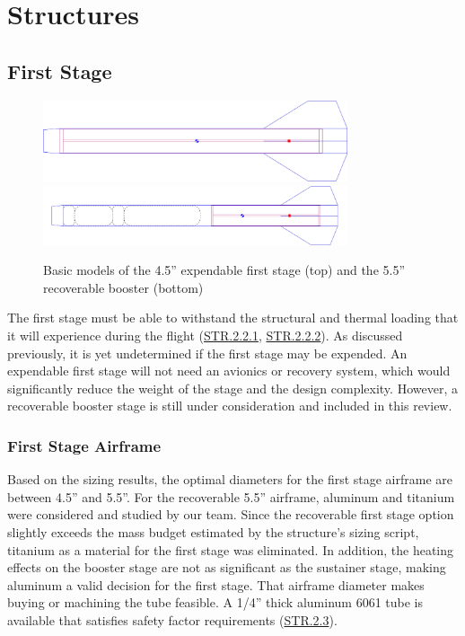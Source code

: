 \section{Structures} \label{section:structures}
\subsection{First Stage}

\begin{figure}
    \centering
    \includegraphics[width=0.8\textwidth]{images/expendable-booster}
    \\ \vspace{0.5cm}
    \includegraphics[width=0.8\textwidth]{images/recoverable-booster}
    \caption{Basic models of the 4.5'' expendable first stage (top) and the 5.5'' recoverable booster (bottom)}
    \label{figure:ork-boosters}
\end{figure}

The first stage must be able to withstand the structural and thermal loading that it will experience during the flight (\hyperlink{STR.2.2.1}{STR.2.2.1}, \hyperlink{STR.2.2.2}{STR.2.2.2}). As discussed previously, it is yet undetermined if the first stage may be expended. An expendable first stage will not need an avionics or recovery system, which would significantly reduce the weight of the stage and the design complexity. However, a recoverable booster stage is still under consideration and included in this review.


\subsubsection{First Stage Airframe}
Based on the sizing results, the optimal diameters for the first stage airframe are between 4.5'' and 5.5''. For the recoverable 5.5'' airframe, aluminum and titanium were considered and studied by our team. Since the recoverable first stage option slightly exceeds the mass budget estimated by the structure's sizing script, titanium as a material for the first stage was eliminated. In addition, the heating effects on the booster stage are not as significant as the sustainer stage, making aluminum a valid decision for the first stage. That airframe diameter makes buying or machining the tube feasible. A 1/4'' thick aluminum 6061 tube is available that satisfies safety factor requirements (\hyperlink{STR.2.3}{STR.2.3}).

